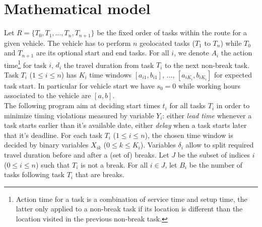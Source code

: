 \documentclass{article}
\begin{document}
\section{Mathematical model}

Let $R=\{T_0, T_1, \ldots, T_n, T_{n + 1}\}$ be the fixed order of
tasks within the route for a given vehicle. The vehicle has to perform
$n$ geolocated tasks ($T_1$ to $T_n$) while $T_0$ and $T_{n + 1}$ are
its optional start and end tasks. For all $i$, we denote $A_i$ the
action time\footnote{Action time for a task is a combination of
  service time and setup time, the latter only applied to a non-break
  task if its location is different than the location visited in the
  previous non-break task.} for task $i$, $d_i$ the travel duration
from task $T_i$ to the next non-break task. Task $T_i$
($1\leq i \leq n$) has $K_i$ time windows $[a_{i1}, b_{i1}]$, $\dots$,
$[a_{iK_i}, b_{iK_i}]$ for expected task start. In particular for
vehicle start we have $s_0 = 0$
while working hours associated to the vehicle are $[a, b]$.\\

The following program aim at deciding start times $t_i$ for all tasks
$T_i$ in order to minimize timing violations measured by variable
$Y_i$: either \textit{lead time} whenever a task starts earlier than
it's available date, either \textit{delay} when a task starts later
that it's deadline. For each task $T_i$ ($1\leq i\leq n$), the chosen
time window is decided by binary variables $X_{ik}$
($0\leq k \leq K_i$). Variables $\delta_i$ allow to split required
travel duration before and after a (set of) breaks. Let $J$ be the
subset of indices $i$ ($0\leq i \leq n$) such that $T_i$ is not a
break. For all $i\in J$, let $B_i$ be the number of tasks following
task $T_i$ that are breaks.
\end{document}

